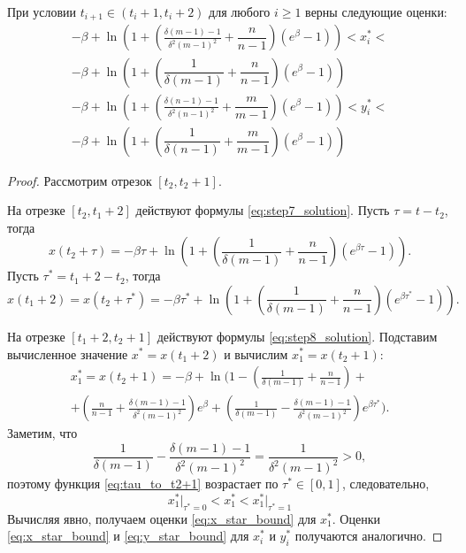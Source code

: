 \begin{lemma}
	\label{lm:xy_star_bounds}
	При условии $t_{i + 1} \in (t_i + 1, t_i + 2)$ для любого $i \geqslant 1$ верны следующие оценки:
	\footnotesize
	\begin{multline}
		\label{eq:x_star_bound}
		-\beta + \ln\left(1 + \left( \frac{\delta(m - 1) - 1}{\delta^2 (m - 1)^2} + \dfrac{n}{n - 1} \right)(e^{\beta} - 1) \right) < x^*_i < \\ -\beta + \ln\left(1 + \left( \dfrac{1}{\delta(m - 1)} + \dfrac{n}{n - 1} \right)(e^{\beta} - 1) \right)
	\end{multline}
	\begin{multline}
		\label{eq:y_star_bound}
		-\beta + \ln\left(1 + \left( \frac{\delta(n - 1) - 1}{\delta^2 (n - 1)^2} + \dfrac{m}{m - 1} \right)(e^{\beta} - 1) \right) < y^*_i < \\ -\beta + \ln\left(1 + \left( \dfrac{1}{\delta(n - 1)} + \dfrac{m}{m - 1} \right)(e^{\beta} - 1) \right)
	\end{multline}
	\normalsize
\end{lemma}
\begin{proof}
	Рассмотрим отрезок $[t_2, t_2 + 1]$.
	
	На отрезке $[t_2, t_1 + 2]$ действуют формулы \eqref{eq:step7_solution}. Пусть $\tau = t - t_2$, тогда
	\[
	x(t_2 + \tau) = - \beta \tau + \ln\left( 1 + \left(\dfrac{1}{\delta(m - 1)} + \dfrac{n}{n - 1}\right) (e^{\beta \tau} - 1) \right).
	\]
	Пусть $\tau^* = t_1 + 2 - t_2$, тогда
	\[
	x(t_1 + 2) = x(t_2 + \tau^*) = -\beta \tau^* + \ln\left( 1 + \left(\dfrac{1}{\delta(m - 1)} + \dfrac{n}{n - 1}\right) (e^{\beta \tau^*} - 1) \right).
	\]
	
	На отрезке $[t_1 + 2, t_2 + 1]$ действуют формулы \eqref{eq:step8_solution}. Подставим вычисленное значение $x^* = x(t_1 + 2)$ и вычислим $x^*_1 = x(t_2 + 1)$:
	\begin{multline}
		\label{eq:tau_to_t2+1}
		x^*_1 = x(t_2 + 1) = -\beta + \ln\Bigg( 1 - \left(\frac{1}{\delta(m - 1)} + \frac{n}{n - 1}\right) + \\ + \left(\frac{n}{n - 1} + \frac{\delta(m - 1) - 1}{\delta^2 (m - 1)^2}\right) e^{\beta} + \left(\frac{1}{\delta(m - 1)} - \frac{\delta(m - 1) - 1}{\delta^2 (m - 1)^2}\right) e^{\beta \tau^*} \Bigg).
	\end{multline}
	Заметим, что 
	\[
	\frac{1}{\delta(m - 1)} - \frac{\delta(m - 1) - 1}{\delta^2 (m - 1)^2} = \frac{1}{\delta^2 (m - 1)^2} > 0,
	\]
	поэтому функция \eqref{eq:tau_to_t2+1} возрастает по $\tau^* \in [0, 1]$, следовательно, 
	\[
	x^*_1 \vert_{\tau^* = 0} < x^*_1 < x^*_1 \vert_{\tau^* = 1}
	\]
	Вычисляя явно, получаем оценки \eqref{eq:x_star_bound} для $x_1^*$. Оценки \eqref{eq:x_star_bound} и \eqref{eq:y_star_bound} для $x_i^*$ и $y_i^*$ получаются аналогично. 
	
\end{proof}

